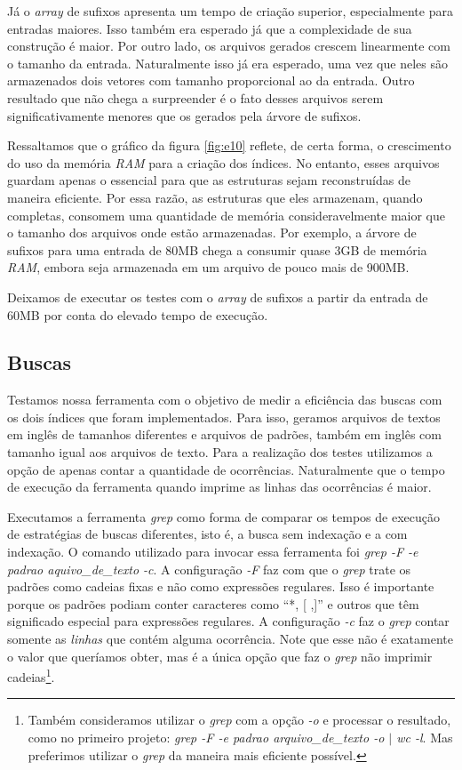 \documentclass[]{article}
\newcommand{\figref}[1]{figura \ref{#1}}
\begin{document}
Já o \textit{array} de sufixos apresenta um tempo de criação superior, especialmente para entradas maiores. Isso também era esperado já que a complexidade de sua construção é maior. Por outro lado, os arquivos gerados crescem linearmente com o tamanho da entrada. Naturalmente isso já era esperado, uma vez que neles são armazenados dois vetores com tamanho proporcional ao da entrada. Outro resultado que não chega a surpreender é o fato desses arquivos serem significativamente menores que os gerados pela árvore de sufixos.


Ressaltamos que o gráfico da \figref{fig:e10} reflete, de certa forma, o crescimento do uso da memória \textit{RAM} para a criação dos índices. No entanto, esses arquivos guardam apenas o essencial para que as estruturas sejam reconstruídas de maneira eficiente. Por essa razão, as estruturas que eles armazenam, quando completas, consomem uma quantidade de memória consideravelmente maior que o tamanho dos arquivos onde estão armazenadas. Por exemplo, a árvore de sufixos para uma entrada de 80MB chega a consumir quase 3GB de memória \textit{RAM}, embora seja armazenada em um arquivo de pouco mais de 900MB.

Deixamos de executar os testes com o \textit{array} de sufixos a partir da entrada de 60MB por conta do elevado tempo de execução. 

\subsection{Buscas}

Testamos nossa ferramenta com o objetivo de medir a eficiência das buscas com os dois índices que foram implementados. Para isso, geramos arquivos de textos em inglês de tamanhos diferentes e arquivos de padrões, também em inglês com tamanho igual aos arquivos de texto. Para a realização dos testes utilizamos a opção de apenas contar a quantidade de ocorrências. Naturalmente que o tempo de execução da ferramenta quando imprime as linhas das ocorrências é maior.

Executamos a ferramenta \textit{grep} como forma de comparar os tempos de execução de estratégias de buscas diferentes, isto é, a busca sem indexação e a com indexação. O comando utilizado para invocar essa ferramenta foi \textit{grep -F -e padrao aquivo\_de\_texto -c}. A configuração \textit{-F} faz com que o \textit{grep} trate os padrões como cadeias fixas e não como expressões regulares. Isso é importante porque os padrões podiam conter caracteres como ``*, [ ,]'' e outros que têm significado especial para expressões regulares. A configuração \textit{-c} faz o \textit{grep} contar somente as \textit{linhas} que contém alguma ocorrência. Note que esse não é exatamente o valor que queríamos obter, mas é a única opção que faz o \textit{grep} não imprimir cadeias\footnote{Também consideramos utilizar o \textit{grep} com a opção \textit{-o} e processar o resultado, como no primeiro projeto: \textit{grep -F -e padrao arquivo\_de\_texto -o $\vert$ wc -l}. Mas preferimos utilizar o \textit{grep} da maneira mais eficiente possível.}.
\end{document}
